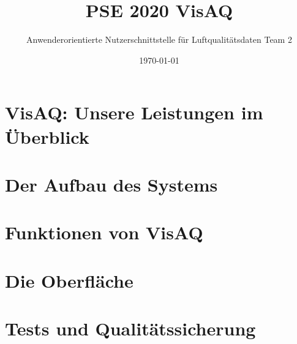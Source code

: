 

\title{PSE 2020 \textbf{VisAQ}}
\subtitle{Anwenderorientierte Nutzerschnittstelle für Luftqualitätsdaten Team 2}
\date{\today}

\usetikzlibrary{matrix}
\usetikzlibrary{arrows.meta}
\usetikzlibrary{automata}
\usetikzlibrary{tikzmark}
\usetikzlibrary{arrows}
\usetikzlibrary{positioning}
\usetikzlibrary{quotes}

\usetikzlibrary{shapes}


\titleframe


\roadmap

\section{VisAQ: Unsere Leistungen im Überblick}
\section{Der Aufbau des Systems}
\section{Funktionen von VisAQ}
\section{Die Oberfläche}
\section{Tests und Qualitätssicherung}
\section{}
\questionframe
\lastframe
